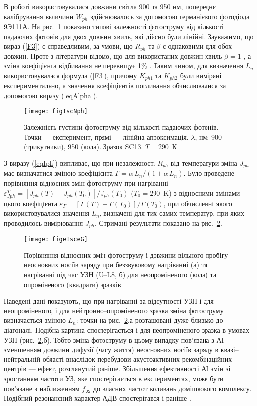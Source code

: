 В роботі використовувалися довжини світла 900 та 950 нм,
попереднє калібрування величини $W_{ph}$ здійснювалось
за допомогою германієвого фотодіода 9Э111А.
На рис.~\ref{figIscNph} показано типові залежності фотоструму від
кількості падаючих фотонів для двох довжин хвиль,
які дійсно були лінійні.
Зауважимо, що вираз (\ref{F3}) є справедливим,
за умови, що $R_{ph}$ та $\beta$ є однаковими для обох довжин.
Проте з літератури відомо, що для використаних довжин хвиль
$\beta=1$ \cite{Gaman}, а зміна коефіцієнта відбивання не перевищує 1\% \cite{GreenOptic,SiOptic:JAP1998,GreenOptic2}.
Таким чином, для визначення $L_n$ використовувалася формула (\ref{F3}),
причому $K_{ph1}$ та $K_{ph2}$ були виміряні експериментально, а значення
коефіцієнтів поглинання обчислювалися за допомогою виразу (\ref{eqAlpha}).

\begin{figure}
\center
\texttt{[image: figIscNph]}
\caption{\label{figIscNph}
Залежність густини фотоструму від кількості падаючих фотонів.
Точки --- експеримент, прямі --- лінійна апроксимація.
$\lambda$, нм: 900 (трикутники), 950 (кола). Зразок SC13. $T = 290$~К
}%
\end{figure}

З виразу (\ref{eqIph}) випливає, що при незалежності $R_{ph}$ від температури
зміна $J_{ph}$ має визначатися зміною
коефіцієнта $\Gamma=\alpha\,L_n/(1+\alpha\,L_n)$.
Було проведене порівняння відносних змін
фотоструму при нагріванні $\varepsilon^T_{Jph}=[J_{ph}(T)-J_{ph}(T_0)]/J_{ph}(T_0)$
($T_0=290$~K)
з відносними змінами цього коефіцієнта $\varepsilon_\Gamma=[\Gamma(T)-\Gamma(T_0)]/\Gamma(T_0)$,
при обчисленні якого використовувалися значення  $L_n$, визначені
для тих самих температур, при яких проводилось вимірювання $J_{ph}$.
Отримані результати показано на рис.~\ref{figeIsceG}.


\begin{figure}
\center
\texttt{[image: figeIsceG]}
\caption{\label{figeIsceG}
Порівняння відносних змін фотоструму і довжини
вільного пробігу неосновних носіїв заряду при беззвуковому
нагріванні (а) та нагріванні під час УЗН (U--L8, б)
для неопроміненого (кола) та опроміненого (квадрати) зразків
}%
\end{figure}

Наведені дані показують, що при нагріванні за відсутності УЗН і для неопроміненого,
і для нейтронно--опроміненого зразка зміна фотоструму визначається зміною
$L_n$:
точки на рис.~\ref{figeIsceG},а розташовані дуже близько до діагоналі.
Подібна картина спостерігається і для неопроміненого зразка в
умовах УЗН (рис.~\ref{figeIsceG},б).
Тобто зміна фотоструму в цьому випадку пов'язана з АІ зменшенням
довжини дифузії (часу життя) неосновних носіїв заряду в квазі--нейтральній
області внаслідок перебудови акустоактивних рекомбінаційних центрів ---
ефект, розглянутий раніше.
Збільшення ефективності АІ змін зі зростанням частоти УЗ, яке
спостерігається в експериментах, може бути пов'язане з наближенням
$f_\mathtt{US}$ до власних частот коливань домішкового комплексу.
Подібний резонансний характер АДВ спостерігався і раніше \cite{Ol_Shav}.




